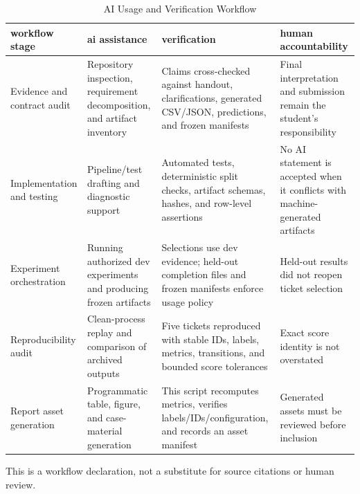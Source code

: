 \begin{table}[t]
\centering
\caption{AI Usage and Verification Workflow}
\label{tab:ai_usage}
\scriptsize
\setlength{\tabcolsep}{3pt}
\renewcommand{\arraystretch}{1.08}
\begin{tabular}{@{}p{}p{}p{}p{}@{}}
\hline
\textbf{workflow stage} & \textbf{ai assistance} & \textbf{verification} & \textbf{human accountability} \\
\hline
Evidence and contract audit & Repository inspection, requirement decomposition, and artifact inventory & Claims cross-checked against handout, clarifications, generated CSV/JSON, predictions, and frozen manifests & Final interpretation and submission remain the student's responsibility \\
Implementation and testing & Pipeline/test drafting and diagnostic support & Automated tests, deterministic split checks, artifact schemas, hashes, and row-level assertions & No AI statement is accepted when it conflicts with machine-generated artifacts \\
Experiment orchestration & Running authorized dev experiments and producing frozen artifacts & Selections use dev evidence; held-out completion files and frozen manifests enforce usage policy & Held-out results did not reopen ticket selection \\
Reproducibility audit & Clean-process replay and comparison of archived outputs & Five tickets reproduced with stable IDs, labels, metrics, transitions, and bounded score tolerances & Exact score identity is not overstated \\
Report asset generation & Programmatic table, figure, and case-material generation & This script recomputes metrics, verifies labels/IDs/configuration, and records an asset manifest & Generated assets must be reviewed before inclusion \\
\hline
\end{tabular}
\par\footnotesize{This is a workflow declaration, not a substitute for source citations or human review.}
\end{table}
